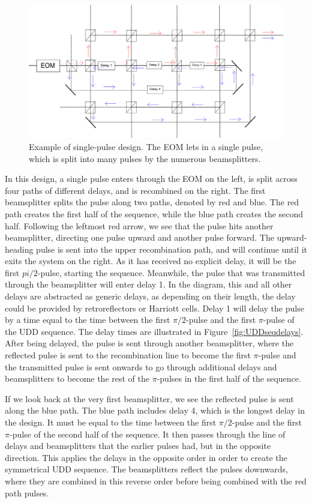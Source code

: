 \documentclass[pdftex,12pt,a4paper]{article}
\begin{document}
\begin{figure}[t]
\centering
\includegraphics[width=\textwidth]{singlepulse.png}
\caption{Example of single-pulse design. The EOM lets in a single pulse, which is split into many pulses by the numerous beamsplitters.}
\label{fig:singlepulse}
\end{figure}

In this design, a single pulse enters through the EOM on the left, is split across four paths of different delays, and is recombined on the right. The first beamsplitter splits the pulse along two paths, denoted by red and blue. The red path creates the first half of the sequence, while the blue path creates the second half. Following the leftmost red arrow, we see that the pulse hits another beamsplitter, directing one pulse upward and another pulse forward. The upward-heading pulse is sent into the upper recombination path, and will continue until it exits the system on the right. As it has received no explicit delay, it will be the first $pi/2$-pulse, starting the sequence. Meanwhile, the pulse that was transmitted through the beamsplitter will enter delay 1. In the diagram, this and all other delays are abstracted as generic delays, as depending on their length, the delay could be provided by retroreflectors or Harriott cells. Delay 1 will delay the pulse by a time equal to the time between the first $\pi/2$-pulse and the first $\pi$-pulse of the UDD sequence. The delay times are illustrated in Figure~\ref{fig:UDDseqdelays}. After being delayed, the pulse is sent through another beamsplitter, where the reflected pulse is sent to the recombination line to become the first $\pi$-pulse and the transmitted pulse is sent onwards to go through additional delays and beamsplitters to become the rest of the $\pi$-pulses in the first half of the sequence.

If we look back at the very first beamsplitter, we see the reflected pulse is sent along the blue path. The blue path includes delay 4, which is the longest delay in the design. It must be equal to the time between the first $\pi/2$-pulse and the first $\pi$-pulse of the second half of the sequence. It then passes through the line of delays and beamsplitters that the earlier pulses had, but in the opposite direction. This applies the delays in the opposite order in order to create the symmetrical UDD sequence. The beamsplitters reflect the pulses downwards, where they are combined in this reverse order before being combined with the red path pulses.
\end{document}
